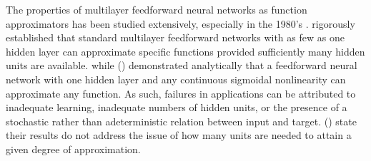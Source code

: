 The properties of multilayer feedforward neural networks as function approximators has been studied extensively, especially in the 1980's . \cite{hornik1989multilayer} rigorously established that standard multilayer feedforward networks with as few as one hidden layer can approximate specific functions provided sufficiently many hidden units are available. while (\cite{cybenko1989approximation}) demonstrated analytically that a feedforward neural network with one hidden layer and any continuous sigmoidal nonlinearity can approximate any function. As such, failures in applications can be attributed to inadequate learning, inadequate numbers of hidden units, or the presence of a  stochastic rather than adeterministic relation between input and target. (\cite{hornik1989multilayer}) state their results do not address the issue of how many units are needed to attain a  given degree of approximation.  













